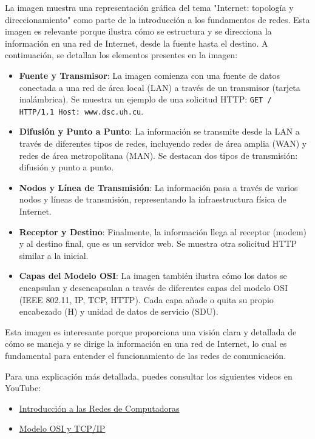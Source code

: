 \documentclass[a4paper,12pt]{article}
\begin{document}
La imagen muestra una representación gráfica del tema "Internet: topología y direccionamiento" como parte de la introducción a los fundamentos de redes. Esta imagen es relevante porque ilustra cómo se estructura y se direcciona la información en una red de Internet, desde la fuente hasta el destino. A continuación, se detallan los elementos presentes en la imagen:

\begin{itemize}
    \item \textbf{Fuente y Transmisor}: La imagen comienza con una fuente de datos conectada a una red de área local (LAN) a través de un transmisor (tarjeta inalámbrica). Se muestra un ejemplo de una solicitud HTTP: \texttt{GET / HTTP/1.1 Host: www.dsc.uh.cu}.
    \item \textbf{Difusión y Punto a Punto}: La información se transmite desde la LAN a través de diferentes tipos de redes, incluyendo redes de área amplia (WAN) y redes de área metropolitana (MAN). Se destacan dos tipos de transmisión: difusión y punto a punto.
    \item \textbf{Nodos y Línea de Transmisión}: La información pasa a través de varios nodos y líneas de transmisión, representando la infraestructura física de Internet.
    \item \textbf{Receptor y Destino}: Finalmente, la información llega al receptor (modem) y al destino final, que es un servidor web. Se muestra otra solicitud HTTP similar a la inicial.
    \item \textbf{Capas del Modelo OSI}: La imagen también ilustra cómo los datos se encapsulan y desencapsulan a través de diferentes capas del modelo OSI (IEEE 802.11, IP, TCP, HTTP). Cada capa añade o quita su propio encabezado (H) y unidad de datos de servicio (SDU).
\end{itemize}

Esta imagen es interesante porque proporciona una visión clara y detallada de cómo se maneja y se dirige la información en una red de Internet, lo cual es fundamental para entender el funcionamiento de las redes de comunicación.

Para una explicación más detallada, puedes consultar los siguientes videos en YouTube:
\begin{itemize}
    \item \href{https://www.youtube.com/watch?v=3QhU9jd03a0}{Introducción a las Redes de Computadoras}
    \item \href{https://www.youtube.com/watch?v=ZxAw8qLlDJE}{Modelo OSI y TCP/IP}
\end{itemize}
\end{document}
